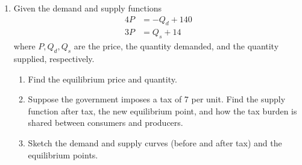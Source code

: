 \documentclass[10pt,openany,a4paper]{article}
\theoremstyle{definition}
\theoremstyle{definition}
\theoremstyle{plain}
\begin{document}
\begin{enumerate}
    \item Given the demand and supply functions
    \begin{align*}
        4P &= -Q_d+140\\
        3P &= Q_s+14
    \end{align*}
    where $P,Q_d,Q_s$ are the price, the quantity demanded, and the quantity supplied, respectively.
    \begin{enumerate}
        \item Find the equilibrium price and quantity.
        \item Suppose the government imposes a tax of 7 per unit. Find the supply function after tax, the new equilibrium point, and how the tax burden is shared between consumers and producers.
        \item Sketch the demand and supply curves (before and after tax) and the equilibrium points.
    \end{enumerate}
\end{enumerate}

\newpage

\end{document}
